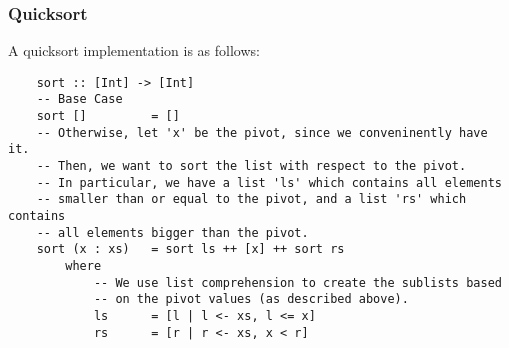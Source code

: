 \documentclass[letterpaper]{article}
\begin{document}
\subsubsection{Quicksort}
A quicksort implementation is as follows: 
\begin{verbatim}
    sort :: [Int] -> [Int]
    -- Base Case
    sort []         = [] 
    -- Otherwise, let 'x' be the pivot, since we conveninently have it.
    -- Then, we want to sort the list with respect to the pivot. 
    -- In particular, we have a list 'ls' which contains all elements 
    -- smaller than or equal to the pivot, and a list 'rs' which contains  
    -- all elements bigger than the pivot. 
    sort (x : xs)   = sort ls ++ [x] ++ sort rs 
        where 
            -- We use list comprehension to create the sublists based 
            -- on the pivot values (as described above).
            ls      = [l | l <- xs, l <= x]
            rs      = [r | r <- xs, x < r]
\end{verbatim}
\end{document}
